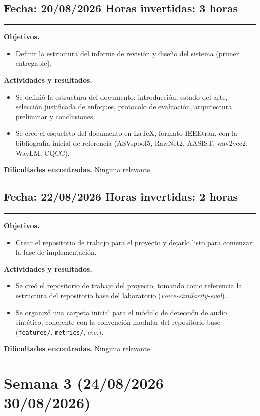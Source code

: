 \documentclass[11pt]{article}
\newenvironment{sesion}[2]{%
  \subsection*{Fecha: #1 \hfill Horas invertidas: #2}
  \vspace{-0.3cm}
  \hrule
  \vspace{0.3cm}
}{\vspace{0.5cm}}
\newcommand{\campo}[1]{\textbf{#1}}
\begin{document}
\begin{sesion}{20/08/2026}{3 horas}
\campo{Objetivos.}
\begin{itemize}
\item Definir la estructura del informe de revisión y diseño del sistema (primer entregable).
\end{itemize}
\campo{Actividades y resultados.}
\begin{itemize}
\item Se definió la estructura del documento: introducción, estado del arte, selección justificada de enfoques, protocolo de evaluación, arquitectura preliminar y conclusiones.
\item Se creó el esqueleto del documento en LaTeX, formato IEEEtran, con la bibliografía inicial de referencia (ASVspoof5, RawNet2, AASIST, wav2vec2, WavLM, CQCC).
\end{itemize}
\campo{Dificultades encontradas.} Ninguna relevante.
\end{sesion}

\begin{sesion}{22/08/2026}{2 horas}
\campo{Objetivos.}
\begin{itemize}
\item Crear el repositorio de trabajo para el proyecto y dejarlo listo para comenzar la fase de implementación.
\end{itemize}
\campo{Actividades y resultados.}
\begin{itemize}
\item Se creó el repositorio de trabajo del proyecto, tomando como referencia la estructura del repositorio base del laboratorio (\textit{voice-similarity-eval}).
\item Se organizó una carpeta inicial para el módulo de detección de audio sintético, coherente con la convención modular del repositorio base (\texttt{features/}, \texttt{metrics/}, etc.).
\end{itemize}
\campo{Dificultades encontradas.} Ninguna relevante.
\end{sesion}

\section{Semana 3 (24/08/2026 -- 30/08/2026)}
\end{document}
